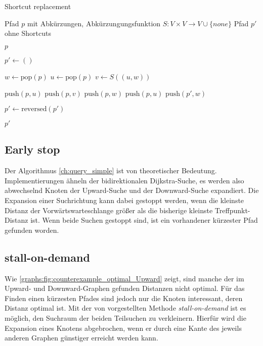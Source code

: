 \begin{algorithm}[ht]
  \caption{Shortcut replacement}
  \begin{algorithmic}[1]
    \Require Pfad $p$ mit Abkürzungen, Abkürzungungsfunktion $S \colon V \times V \to V \cup \{ {none} \}$
    \Ensure Pfad $p'$ ohne Shortcuts

    \State \Return $p$
    \EndIf
    \State

    \State $p' \leftarrow ()$
    \State

    \State $w \leftarrow \text{pop}(p)$
    \State $u \leftarrow \text{pop}(p)$
    \State $v \leftarrow S((u, w))$
    \State

    \State $\text{push}(p, u)$
    \State $\text{push}(p, v)$
    \State $\text{push}(p, w)$
    \Else
    \State $\text{push}(p, u)$
    \State $\text{push}(p', w)$
    \EndIf
    \EndWhile

    \State
    \State $p' \leftarrow \text{reversed}(p')$

    \State
    \State \Return $p'$
  \end{algorithmic}
  \label{ch:alg:shortcut_replacement}
\end{algorithm}

\subsection{Early stop}

Der Algorithmus \ref{ch:query_simple} ist von theoretischer Bedeutung.
Implementierungen ähneln der bidirektionalen Dijkstra-Suche, es werden also abwechselnd Knoten der Upward-Suche und der Downward-Suche expandiert.
Die Expansion einer Suchrichtung kann dabei gestoppt werden, wenn die kleinste Distanz der Vorwärtswarteschlange größer als die bisherige kleinste Treffpunkt-Distanz ist.
Wenn beide Suchen gestoppt sind, ist ein vorhandener kürzester Pfad gefunden worden.

\subsection{stall-on-demand}

Wie \autoref{graphs:fig:counterexample_optimal_Upward} zeigt, sind manche der im Upward- und Downward-Graphen gefunden Distanzen nicht optimal.
Für das Finden einen kürzesten Pfades sind jedoch nur die Knoten interessant, deren Distanz optimal ist.
Mit der von \cite{schultes2007dynamic} vorgestellten Methode \emph{stall-on-demand} ist es möglich, den Suchraum der beiden Teilsuchen zu verkleinern.
Hierfür wird die Expansion eines Knotens abgebrochen, wenn er durch eine Kante des jeweils anderen Graphen günstiger erreicht werden kann.

